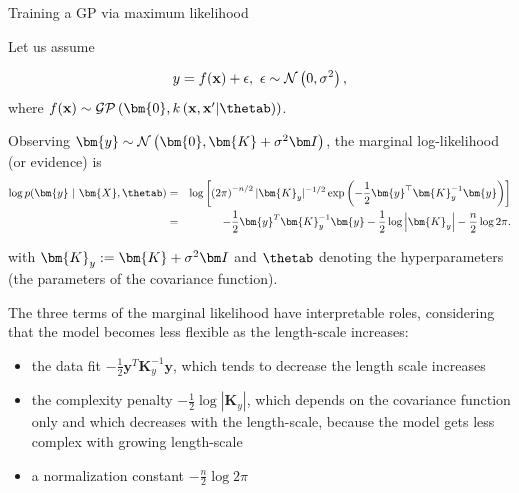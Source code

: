 \begin{vbframe}{Training a GP via maximum likelihood}

Let us assume 

$$
	y = f(\mathbf{x}) + \epsilon, ~ \epsilon \sim \mathcal{N}\left(0, \sigma^2\right),
$$
where $\fx \sim \mathcal{GP}\left(\bm{0}, k\left(\xv, \xv^\prime | \thetab \right)\right)$. 

\lz 

Observing $\bm{y} \sim \mathcal{N}\left(\bm{0}, \bm{K} + \sigma^2 \id\right)$, the marginal log-likelihood (or evidence) is
\begin{eqnarray*}
\log p(\bm{y} ~|~ \bm{X}, \thetab) &=& \log \left[\left(2 \pi\right)^{-n / 2} |\bm{K}_y|^{-1 / 2} \exp\left(- \frac{1}{2} \bm{y}^\top \bm{K}_y^{-1} \bm{y}\right) \right]\\
&=& -\frac{1}{2}\bm{y}^T\bm{K}_y^{-1} \bm{y} - \frac{1}{2} \log \left| \bm{K}_y \right| - \frac{n}{2} \log 2\pi. 
\end{eqnarray*}

with $\bm{K}_y:=\bm{K} + \sigma^2 \id$ and $\thetab$ denoting the hyperparameters (the parameters of the covariance function). 

\framebreak


The three terms of the marginal likelihood have interpretable roles, considering that 
the model becomes less flexible as the length-scale increases:

\begin{itemize}
\item the data fit $-\frac{1}{2}\bm{y}^T\bm{K}_y^{-1} \bm{y}$, which tends to decrease the length scale increases
\item the complexity penalty $- \frac{1}{2} \log \left| \bm{K}_y \right|$, which depends on the covariance function only and which decreases with the length-scale, because the model gets less complex with growing length-scale
\item a normalization constant $- \frac{n}{2} \log 2\pi$
\end{itemize}

\end{vbframe}

